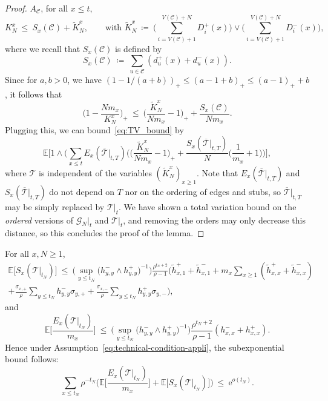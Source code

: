 \begin{refsegment}
\begin{proof}
$A_{\mathcal{C}}$, for all $x\leq t$,
\[
  K_N^x\ \leq\ S_x(\mathcal{C}) + \tilde{K}_N^x, \qquad \text{with
  }\tilde{K}_N^x\ \coloneqq\
  \bigg( \sum_{i=V(\mathcal{C})+1}^{V(\mathcal{C})+N}
  D^+_i(x)\bigg)\vee \bigg(\sum_{i=V(\mathcal{C})+1}^{V(\mathcal{C})+N}
  D^-_i(x)\bigg),
\]
where we recall that $S_x(\mathcal{C})$ is defined by
\[
  S_x(\mathcal{C}) \ \coloneqq\ \sum_{u\in \mathcal{C}}(d_u^+(x)+d_u^-(x)).
\]
Since for $a, b>0$, we have
$(1-1/(a+b))_+ \leq (a-1+b)_+\leq (a-1)_+ + b$, it
follows that
\[
  \Big(1-\frac{N m_{x} }{K_N^{x}}\Big)_+\ \leq\ \Big(\frac{\tilde{K}_N^{x}}{N
    m_{x}} - 1\Big)_+ + \frac{S_x(\mathcal{C})}{Nm_x}.
\]
Plugging this, we can bound~\eqref{eq:TV_bound} by
\begin{equation}
  \label{eq:bound_TV_2}
  \mathbb{E}\Big[1\wedge \bigg(\sum_{x\leq
    t}E_x(\overline{\mathcal{T}}|_{t,T})\bigg(
  \Big(\frac{\tilde{K}_N^{x}}{N m_{x}} - 1\Big)_+ + \frac{S_x(\overline{\mathcal{T}}|_{t,T})}{N} \Big(\frac{1}{m_x} + 1 \Big)
  \bigg)\bigg],
\end{equation}
where $\mathcal{T}$ is independent of the variables
$(\tilde{K}_N^x)_{x\geq 1}$. Note that
$E_x(\overline{\mathcal{T}}|_{t,T})$ and
$S_x(\overline{\mathcal{T}}|_{t,T})$ do not depend on $T$ nor on the
ordering of edges and stubs, so $\overline{\mathcal{T}}|_{t,T}$ may be
simply replaced by $\mathcal{T}|_{t}$. We have shown a total variation
bound on the \emph{ordered} versions of $\mathcal{G}_N|_t$ and
$\mathcal{T}|_t$, and removing the orders may only decrease this
distance, so this concludes the proof of the lemma.
\end{proof}

\begin{lem} \label{lem:proof_coupling_2}
  For all $x,N\geq 1$, 
  \begin{multline}
  \label{eq:bound_S_x_2}
    \mathbb{E} \big[S_x(\mathcal{T}|_{t_N})\big]\ \leq\ \Big(\sup_{y\leq
    t_N}\big(h^-_{y,y}\wedge h^+_{y,y}\big)^{-1} \Big)
     \frac{\rho^{t_N+2}}{\rho-1}
    \Big(\tilde{h}^+_{x,1} +
      \tilde{h}^-_{x,1} + m_x \sum_{x\geq 1}(\tilde{h}^+_{x,x} + \tilde{h}^-_{x,x}) \\
   + \frac{\sigma_{x,+}}{\rho}\sum_{y\leq t_N}
      h_{y,y}^- \sigma_{y,+} + \frac{\sigma_{x,-}}{\rho}\sum_{y\leq t_N}
      h_{y,y}^+ \sigma_{y,-} \Big),
\end{multline}
and
\begin{equation} \label{eq:bound_E_x}
  \mathbb{E}\Big[\frac{E_x(\mathcal{T}|_{t_N})}{m_x}\Big]\ \leq\
  \Big(\sup_{y\leq t_N}\big(h^-_{y,y}\wedge h^+_{y,y}\big)^{-1} \Big)
  \frac{\rho^{t_N+2}}{\rho-1} (h^-_{x,x}+h^+_{x,x}).
\end{equation}
Hence under Assumption~\eqref{eq:technical-condition-appli}, the subexponential bound follows:
\begin{equation}
  \label{eq:bounds_E_and_S}
  \sum_{x\leq t_N}\rho^{-t_N}
  \Big(\mathbb{E}\Big[\frac{E_x(\mathcal{T}|_{t_N})}{m_x}\Big]
  + \mathbb{E}\big[S_x(\mathcal{T}|_{t_N})\big] \Big) \ \leq\
  \mathrm{e}^{o(t_N)}.
\end{equation}
\end{lem}


\end{refsegment}
